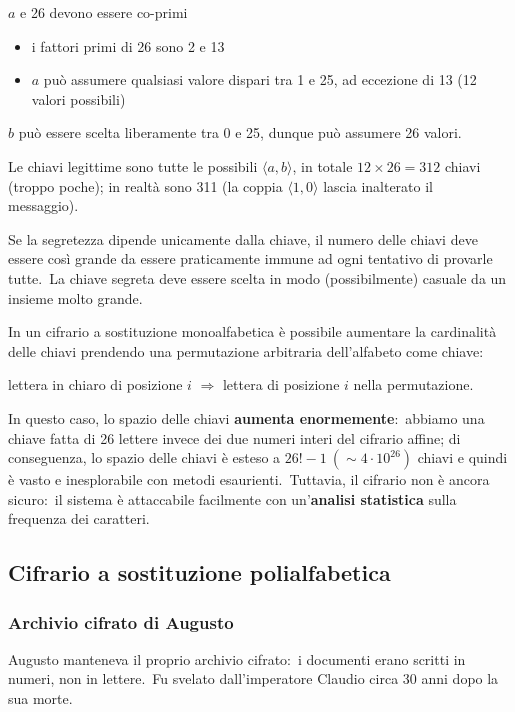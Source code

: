 \vspace{12pt}
\noindent$a$ e 26 devono essere co-primi
\begin{itemize}
    \item i fattori primi di 26 sono 2 e 13
    \item $a$ può assumere qualsiasi valore dispari tra 1 e 25, ad eccezione di 13 (12 valori possibili)
\end{itemize}
$b$ può essere scelta liberamente tra 0 e 25, dunque può assumere 26 valori.
\vspace{12pt}

\noindent Le chiavi legittime sono tutte le possibili $\langle a,b \rangle$, in totale $12 \times 26 = 312$ chiavi (troppo poche); in realtà sono 311 (la coppia $\langle 1,0 \rangle$ lascia inalterato il messaggio).\

Se la segretezza dipende unicamente dalla chiave, il numero delle chiavi deve essere così grande da essere praticamente immune ad ogni tentativo di provarle tutte.\
La chiave segreta deve essere scelta in modo (possibilmente) casuale da un insieme molto grande.\

In un cifrario a sostituzione monoalfabetica è possibile aumentare la cardinalità delle chiavi prendendo una permutazione arbitraria dell'alfabeto come chiave:
\begin{center}
    lettera in chiaro di posizione $i$ $\Rightarrow$ lettera di posizione $i$ nella permutazione.
\end{center}

\noindent In questo caso, lo spazio delle chiavi \textbf{aumenta enormemente}:\ abbiamo una chiave fatta di 26 lettere invece dei due numeri interi del cifrario affine; di conseguenza, lo spazio delle chiavi è esteso a $26! - 1\ (\sim 4\cdot 10^{26})$ chiavi e quindi è vasto e inesplorabile con metodi esaurienti.\
Tuttavia, il cifrario non è ancora sicuro:\ il sistema è attaccabile facilmente con un'\textbf{analisi statistica} sulla frequenza dei caratteri.\

\subsection{Cifrario a sostituzione polialfabetica}

\subsubsection{Archivio cifrato di Augusto}

Augusto manteneva il proprio archivio cifrato:\ i documenti erano scritti in numeri, non in lettere.\
Fu svelato dall'imperatore Claudio circa 30 anni dopo la sua morte.\

